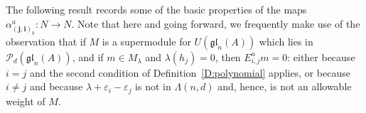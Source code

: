 \documentclass[11pt,reqno]{amsart} %
\newcommand{\gl}{\mathfrak{gl}}
\newcommand{\0}{\bar{0}}
\newcommand{\1}{\bar{1}}
\newcommand{\bi}{\mathbf{i}}
\newcommand{\bj}{\mathbf{j}}
\newcommand{\Itwo}{\tilde{I}^{2}(n,d)}
\newcommand{\Pol}{\mathcal{P}}
\numberwithin{equation}{subsection}
\begin{document}
The following result records some of the basic properties of the maps $\alpha^{a}_{(\bj , \bi)_{k}}:N \to N$.  Note that here and going forward, we frequently make use of the observation that if $M$ is a supermodule for $U(\gl_{n}(A))$ which lies in $\Pol_{d}(\gl_{n}(A))$, and if $m \in M_{\lambda}$ and $\lambda (h_{j}) = 0$, then $E_{i,j}^{a}m=0$: either because $i=j$ and the second condition of Definition~\ref{D:polynomial}  applies, or because $i \neq j$ and because $\lambda +\varepsilon_{i} - \varepsilon_{j}$ is not in $\Lambda(n,d)$ and, hence, is not an allowable weight of $M$.


\end{document}
